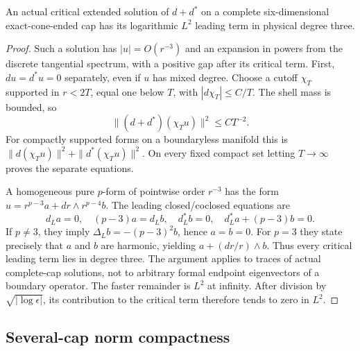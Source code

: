 \begin{lemma}\label{lem:critical-degree}
An actual critical extended solution of $d+d^*$ on a complete
six-dimensional exact-cone-ended cap has its logarithmic $L^2$ leading
term in physical degree three.
\end{lemma}
\begin{proof}
Such a solution has $|u|=O(r^{-3})$ and an expansion in powers from
the discrete tangential spectrum, with a positive gap after its critical
term. First, $du=d^*u=0$ separately, even if $u$ has mixed degree.
Choose a cutoff $\chi_T$ supported in $r<2T$, equal one below $T$,
with $|d\chi_T|\le C/T$. The shell mass is bounded, so
\[
 \|(d+d^*)(\chi_Tu)\|^2\le CT^{-2}.
\]
For compactly supported forms on a boundaryless manifold this is
$\|d(\chi_Tu)\|^2+\|d^*(\chi_Tu)\|^2$. On every fixed compact
set letting $T\to\infty$ proves the separate equations.

A homogeneous pure $p$-form of pointwise order $r^{-3}$ has the form
$u=r^{p-3}a+dr\wedge r^{p-4}b$. The leading closed/coclosed equations are
\[
 d_La=0,\quad (p-3)a=d_Lb,\quad d_L^*b=0,\quad
 d_L^*a+(p-3)b=0.
\]
If $p\ne3$, they imply $\Delta_Lb=-(p-3)^2b$, hence $a=b=0$.
For $p=3$ they state precisely that $a$ and $b$ are harmonic, yielding
$a+(dr/r)\wedge b$. Thus every critical leading term lies in degree
three. The argument applies to traces of actual complete-cap solutions,
not to arbitrary formal endpoint eigenvectors of a boundary operator.
The faster remainder is $L^2$ at infinity. After division by
$\sqrt{|\log\epsilon|}$, its contribution to the critical term
therefore tends to zero in $L^2$.
\end{proof}

\subsection{Several-cap norm compactness}

